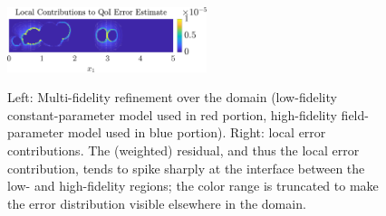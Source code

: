 \documentclass[review,sort&compress]{elsarticle}
\begin{document}
\begin{figure}[htbp]
{  \includegraphics[width=0.52\textwidth]{svf/err_breakdown_MF02.pdf} %
} \\
\caption{Left: Multi-fidelity refinement over the domain (low-fidelity constant-parameter model used in red portion, high-fidelity field-parameter model used in blue portion). Right: local error contributions. The (weighted) residual, and thus the local error contribution, tends to spike sharply at the interface between the low- and high-fidelity regions; the color range is truncated to make the error distribution visible elsewhere in the domain.}
\label{fig:svfRef}
\end{figure}
\end{document}
